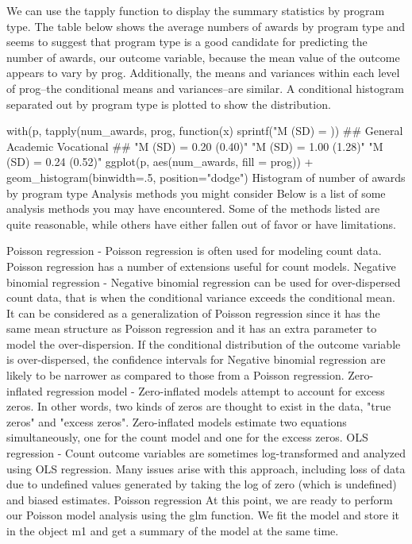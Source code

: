 We can use the tapply function to display the summary statistics by program type. The table below shows the average numbers of awards by program type and seems to suggest that program type is a good candidate for predicting the number of awards, our outcome variable, because the mean value of the outcome appears to vary by prog. Additionally, the means and variances within each level of prog--the conditional means and variances--are similar. A conditional histogram separated out by program type is plotted to show the distribution.

with(p, tapply(num_awards, prog, function(x) {
  sprintf("M (SD) = %
}))
##                General               Academic             Vocational 
## "M (SD) = 0.20 (0.40)" "M (SD) = 1.00 (1.28)" "M (SD) = 0.24 (0.52)"
ggplot(p, aes(num_awards, fill = prog)) +
  geom_histogram(binwidth=.5, position="dodge")
Histogram of number of awards by program type
Analysis methods you might consider
Below is a list of some analysis methods you may have encountered. Some of the methods listed are quite reasonable, while others have either fallen out of favor or have limitations.

Poisson regression - Poisson regression is often used for modeling count data. Poisson regression has a number of extensions useful for count models.
Negative binomial regression - Negative binomial regression can be used for over-dispersed count data, that is when the conditional variance exceeds the conditional mean. It can be considered as a generalization of Poisson regression since it has the same mean structure as Poisson regression and it has an extra parameter to model the over-dispersion. If the conditional distribution of the outcome variable is over-dispersed, the confidence intervals for Negative binomial regression are likely to be narrower as compared to those from a Poisson regression.
Zero-inflated regression model - Zero-inflated models attempt to account for excess zeros. In other words, two kinds of zeros are thought to exist in the data, "true zeros" and "excess zeros". Zero-inflated models estimate two equations simultaneously, one for the count model and one for the excess zeros.
OLS regression - Count outcome variables are sometimes log-transformed and analyzed using OLS regression. Many issues arise with this approach, including loss of data due to undefined values generated by taking the log of zero (which is undefined) and biased estimates.
Poisson regression
At this point, we are ready to perform our Poisson model analysis using the glm function. We fit the model and store it in the object m1 and get a summary of the model at the same time.


